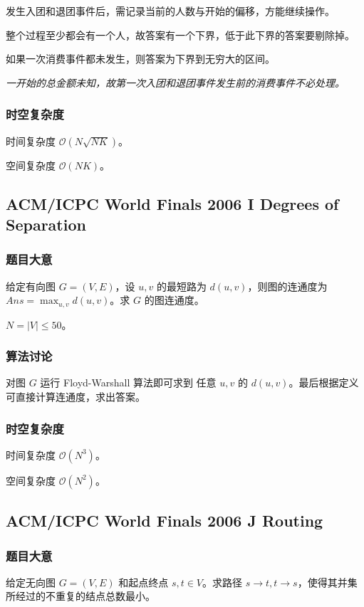 				发生入团和退团事件后，需记录当前的人数与开始的偏移，方能继续操作。
				
				整个过程至少都会有一个人，故答案有一个下界，低于此下界的答案要剔除掉。
				
				如果一次消费事件都未发生，则答案为下界到无穷大的区间。
				
				\emph{一开始的总金额未知，故第一次入团和退团事件发生前的消费事件不必处理。}
			\subsubsection{时空复杂度}
				
				时间复杂度 $\mathcal{O}\left(N\sqrt{NK}\right)$。
					
				空间复杂度 $\mathcal{O}\left(NK\right)$。
		\newpage
		\subsection{ACM/ICPC World Finals 2006 I Degrees of Separation}
			\subsubsection{题目大意}
				给定有向图 $G = (V, E)$，设 $u, v$ 的最短路为 $d(u, v)$，则图的连通度为 $Ans = \max_{u, v} d(u, v)$。求 $G$ 的图连通度。
				
				$N = |V| \le 50$。
			\subsubsection{算法讨论}
				对图 $G$ 运行 Floyd-Warshall 算法即可求到 任意 $u, v$ 的 $d(u, v)$。最后根据定义可直接计算连通度，求出答案。
			\subsubsection{时空复杂度}
				
				时间复杂度 $\mathcal{O}\left(N^3\right)$。
					
				空间复杂度 $\mathcal{O}\left(N^2\right)$。
		\newpage
		\subsection{ACM/ICPC World Finals 2006 J Routing}
			\subsubsection{题目大意}
				给定无向图 $G = (V, E)$ 和起点终点 $s, t \in V$。求路径 $s \rightarrow t, t \rightarrow s$，使得其并集所经过的不重复的结点总数最小。
				
